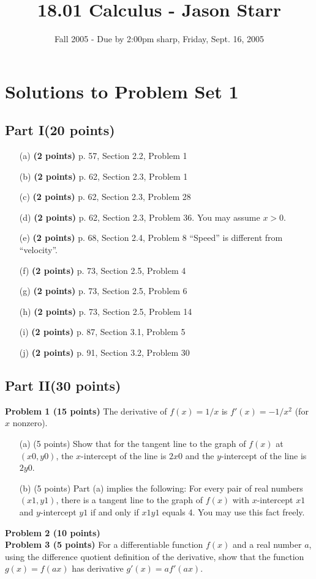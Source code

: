 \documentclass{article}
\title{18.01 Calculus - Jason Starr}
\date{Fall 2005 - Due by 2:00pm sharp, Friday, Sept. 16, 2005}
\begin{document}
\maketitle
\section*{Solutions to Problem Set 1}
\subsection*{Part I(20 points)}
\begin{enumerate}
  \item[(a)] \textbf{(2 points)} p. 57, Section 2.2, Problem 1
  \item[(b)] \textbf{(2 points)} p. 62, Section 2.3, Problem 1
  \item[(c)] \textbf{(2 points)} p. 62, Section 2.3, Problem 28
  \item[(d)] \textbf{(2 points)} p. 62, Section 2.3, Problem 36. You may assume $x > 0$.
  \item[(e)] \textbf{(2 points)} p. 68, Section 2.4, Problem 8 ``Speed'' is different from ``velocity''.
  \item[(f)] \textbf{(2 points)} p. 73, Section 2.5, Problem 4
  \item[(g)] \textbf{(2 points)} p. 73, Section 2.5, Problem 6
  \item[(h)] \textbf{(2 points)} p. 73, Section 2.5, Problem 14
  \item[(i)] \textbf{(2 points)} p. 87, Section 3.1, Problem 5
  \item[(j)] \textbf{(2 points)} p. 91, Section 3.2, Problem 30
\end{enumerate}

\subsection*{Part II(30 points)}
\textbf{Problem 1 (15 points)} The derivative of $f (x) = 1/x$ is $f' (x) = -1/x^2$ (for $x$ nonzero).
\begin{enumerate}
\item[(a)] (5 points) Show that for the tangent line to the graph of $f (x)$ at $(x0, y0)$, the $x$-intercept of the line is $2x0$ and the $y$-intercept of the line is $2y0$.
\item[(b)] (5 points) Part (a) implies the following: For every pair of real numbers $(x1, y1)$, there is a tangent line to the graph of $f (x)$ with $x$-intercept $x1$ and $y$-intercept $y1$ if and only if $x1y1$ equals 4. You may use this fact freely.
\end{enumerate}

\textbf{Problem 2 (10 points)} \\
\textbf{Problem 3 (5 points)} For a differentiable function $f (x)$ and a real number $a$, using the difference quotient definition of the derivative, show that the function $g(x) = f (ax)$ has derivative $g' (x) = af '(ax)$.
\end{document}
